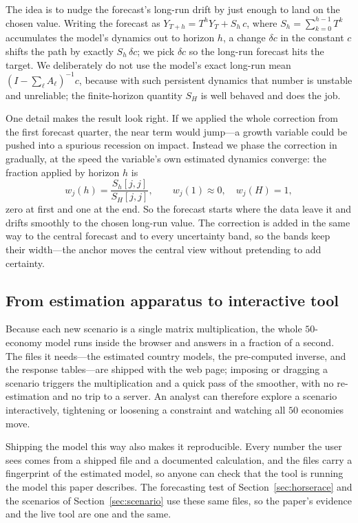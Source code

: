 \documentclass[11pt]{article}
\begin{document}
The idea is to nudge the forecast's long-run drift by just enough to land on the chosen value. Writing the
forecast as $Y_{T+h} = T^{h}Y_T + S_h\,c$, where $S_h=\sum_{k=0}^{h-1}T^{k}$ accumulates the model's
dynamics out to horizon $h$, a change $\delta c$ in the constant $c$ shifts the path by exactly
$S_h\,\delta c$; we pick $\delta c$ so the long-run forecast hits the target. We deliberately do not use
the model's exact long-run mean $(I-\sum_\ell A_\ell)^{-1}c$, because with such persistent dynamics that
number is unstable and unreliable; the finite-horizon quantity $S_H$ is well behaved and does the job.

One detail makes the result look right. If we applied the whole correction from the first forecast
quarter, the near term would jump---a growth variable could be pushed into a spurious recession on impact.
Instead we phase the correction in gradually, at the speed the variable's own estimated dynamics converge:
the fraction applied by horizon $h$ is
\begin{equation}
  w_j(h) = \frac{S_h[j,j]}{S_H[j,j]}, \qquad w_j(1)\approx 0, \quad w_j(H)=1,
  \label{eq:transition}
\end{equation}
zero at first and one at the end. So the forecast starts where the data leave it and drifts smoothly to
the chosen long-run value. The correction is added in the same way to the central forecast and to every
uncertainty band, so the bands keep their width---the anchor moves the central view without pretending to
add certainty.

\subsection{From estimation apparatus to interactive tool}
\label{sub:tool}

Because each new scenario is a single matrix multiplication, the whole $50$-economy model runs inside the
browser and answers in a fraction of a second. The files it needs---the estimated country models, the
pre-computed inverse, and the response tables---are shipped with the web page; imposing or dragging a
scenario triggers the multiplication and a quick pass of the smoother, with no re-estimation and no trip
to a server. An analyst can therefore explore a scenario interactively, tightening or loosening a
constraint and watching all $50$ economies move.

Shipping the model this way also makes it reproducible. Every number the user sees comes from a shipped
file and a documented calculation, and the files carry a fingerprint of the estimated model, so anyone can
check that the tool is running the model this paper describes. The forecasting test of
Section~\ref{sec:horserace} and the scenarios of Section~\ref{sec:scenario} use these same files, so the
paper's evidence and the live tool are one and the same.
\end{document}
